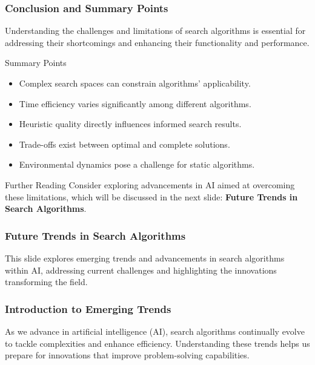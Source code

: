 \documentclass[aspectratio=169]{beamer}
\begin{document}
\begin{frame}[fragile]
    \frametitle{Conclusion and Summary Points}
    Understanding the challenges and limitations of search algorithms is essential for addressing their shortcomings and enhancing their functionality and performance.

    \begin{block}{Summary Points}
        \begin{itemize}
            \item Complex search spaces can constrain algorithms' applicability.
            \item Time efficiency varies significantly among different algorithms.
            \item Heuristic quality directly influences informed search results.
            \item Trade-offs exist between optimal and complete solutions.
            \item Environmental dynamics pose a challenge for static algorithms.
        \end{itemize}
    \end{block}

    \begin{block}{Further Reading}
        Consider exploring advancements in AI aimed at overcoming these limitations, which will be discussed in the next slide: \textbf{Future Trends in Search Algorithms}.
    \end{block}
\end{frame}

\begin{frame}[fragile]
    \frametitle{Future Trends in Search Algorithms}
    This slide explores emerging trends and advancements in search algorithms within AI, addressing current challenges and highlighting the innovations transforming the field.
\end{frame}

\begin{frame}[fragile]
    \frametitle{Introduction to Emerging Trends}
    As we advance in artificial intelligence (AI), search algorithms continually evolve to tackle complexities and enhance efficiency. Understanding these trends helps us prepare for innovations that improve problem-solving capabilities.
\end{frame}
\end{document}
